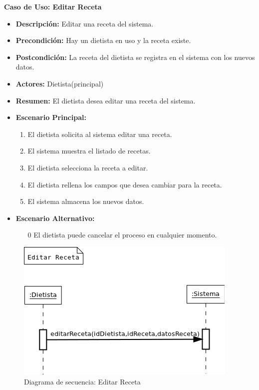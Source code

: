 \textbf{Caso de Uso: Editar Receta}
\begin{itemize}
\item \textbf{Descripción:} Editar una receta del sistema.
\item \textbf{Precondición:} Hay un dietista en uso y la receta existe.
\item \textbf{Postcondición:} La receta del dietista se registra en el sistema con los nuevos datos.
\item \textbf{Actores:} Dietista(principal)
\item \textbf{Resumen:} El dietista desea editar una receta del sistema.
\item \textbf{Escenario Principal:}
\begin{enumerate}
\item El dietista solicita al sistema editar una receta.
\item El sistema muestra el listado de recetas.
\item El dietista selecciona la receta a editar.
\item El dietista rellena los campos que desea cambiar para la receta.
\item El sistema almacena los nuevos datos.
\end{enumerate}
\item \textbf{Escenario Alternativo:}
\begin{enumerate}
\item[0] El dietista puede cancelar el proceso en cualquier momento.
\end{enumerate}
\end{itemize}
\begin{figure}[H]
  \label{ds_editarreceta}
  \begin{center}
    \includegraphics[scale=0.7]{../img/DS_EditarReceta.png}
  \end{center}
  \caption{Diagrama de secuencia: Editar Receta}
\end{figure}
